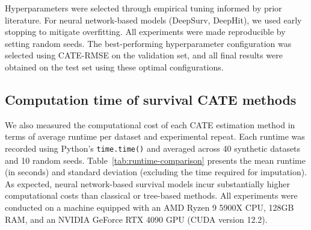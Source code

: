 \documentclass{article} %
\begin{document}
Hyperparameters were selected through empirical tuning informed by prior literature. For neural network-based models (DeepSurv, DeepHit), we used early stopping to mitigate overfitting. All experiments were made reproducible by setting random seeds. The best-performing hyperparameter configuration was selected using CATE-RMSE on the validation set, and all final results were obtained on the test set using these optimal configurations.

\clearpage
\subsection{Computation time of survival CATE methods}

We also measured the computational cost of each CATE estimation method in terms of average runtime per dataset and experimental repeat. Each runtime was recorded using Python’s \texttt{time.time()} and averaged across 40 synthetic datasets and 10 random seeds. Table~\ref{tab:runtime-comparison} presents the mean runtime (in seconds) and standard deviation (excluding the time required for imputation). 
As expected, neural network-based survival models incur substantially higher computational costs than classical or tree-based methods. All experiments were conducted on a machine equipped with an AMD Ryzen 9 5900X CPU, 128GB RAM, and an NVIDIA GeForce RTX 4090 GPU (CUDA version 12.2).
\end{document}
